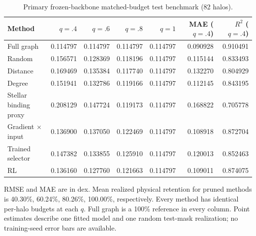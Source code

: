 \begin{table}[t]
\centering
\small
\caption{Primary frozen-backbone matched-budget test benchmark (82 halos).}
\label{tab:cosmic-2}
\setlength{\tabcolsep}{4pt}
\begin{tabular}{lrrrrrr}
\toprule
Method & $q=.4$ & $q=.6$ & $q=.8$ & $q=1$ & MAE ($q=.4$) & $R^2$ ($q=.4$) \\
\midrule
Full graph & 0.114797 & 0.114797 & 0.114797 & 0.114797 & 0.090928 & 0.910491 \\
Random & 0.156571 & 0.128369 & 0.118196 & 0.114797 & 0.115144 & 0.833493 \\
Distance & 0.169469 & 0.135384 & 0.117740 & 0.114797 & 0.132270 & 0.804929 \\
Degree & 0.151941 & 0.132786 & 0.119166 & 0.114797 & 0.112145 & 0.843195 \\
Stellar binding proxy & 0.208129 & 0.147724 & 0.119173 & 0.114797 & 0.168822 & 0.705778 \\
Gradient $\times$ input & 0.136900 & 0.137050 & 0.122469 & 0.114797 & 0.108918 & 0.872704 \\
Trained selector & 0.147382 & 0.133855 & 0.125910 & 0.114797 & 0.120013 & 0.852463 \\
RL & 0.136160 & 0.127760 & 0.121663 & 0.114797 & 0.109011 & 0.874075 \\
\bottomrule
\end{tabular}
\par\smallskip
\begin{minipage}{0.98\textwidth}
\footnotesize RMSE and MAE are in dex. Mean realized physical retention for pruned methods is 40.30\%, 60.24\%, 80.26\%, 100.00\%, respectively. Every method has identical per-halo budgets at each $q$. Full graph is a 100\% reference in every column. Point estimates describe one fitted model and one random test-mask realization; no training-seed error bars are available.
\end{minipage}
\end{table}
